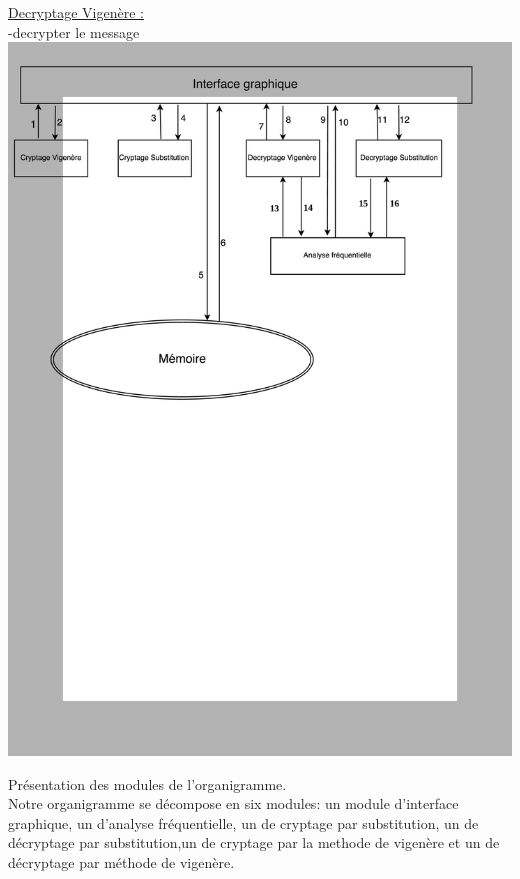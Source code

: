 \documentclass[a4]{article}
\begin{document}
			\underline{Decryptage Vigenère :}\\
			-decrypter le message\\
			
			
%
\includegraphics[scale=0.9]{organigramme_rapport.jpg}



Présentation des modules de l'organigramme. \\

	Notre organigramme se décompose en six modules: un module d'interface graphique, un d'analyse fréquentielle, un de cryptage 
  par substitution, un de décryptage par substitution,un de cryptage par la methode de vigenère et un de décryptage par méthode 
  de vigenère. \\
\end{document}
